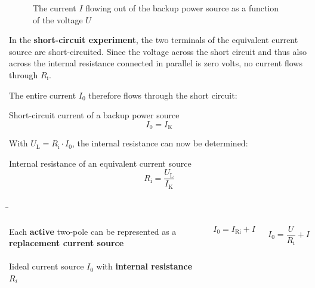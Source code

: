 \begin{frame}
{\begin{figure}[h!]
			\caption{The current $I$ flowing out of the backup power source as a function of the voltage $U$}
			\label{fig:kennliniestrom}
		\end{figure}
		
		
		
		In the \textbf{short-circuit experiment}, the two terminals of the equivalent current source are short-circuited. 
        Since the voltage across the short circuit and thus
        also across the internal resistance connected in parallel is zero volts, no current flows through 
        $R_\mathrm{i}$.

		The entire current $I_0$ therefore flows through the short circuit:
		
		
		
		\begin{Key point}{Short-circuit current of a backup power source}{}
			\begin{equation*}
				I_0 = I_\mathrm{K}
			\end{equation*}
		\end{Key point}
		
		
		
		
		With $U_\mathrm{L} = R_\mathrm{i} \cdot I_0$, the internal resistance can now be determined:
		
		\begin{Key point}{Internal resistance of an equivalent current source}{}
			\begin{equation*}
				R_\mathrm{i} = \frac{U_\mathrm{L}}{I_\mathrm{K}}
			\end{equation*}
		\end{Key point}	
		
	}
	\b{
	
		\begin{columns}
			
			
			Each \textbf{active} two-pole can be represented as a \textbf{replacement current source}\\
			
			\phantom{text}\\
			
			Iideal current source $I_0$ with 
			\textbf{internal resistance} $R_i$
			
			\begin{equation*}
				I_0 = I_\mathrm{Ri} + I
			\end{equation*}
			
			\begin{equation*}
				I_0 =\frac{U}{R_\mathrm{i}} + I
			\end{equation*}
			

\end{columns}}
\end{frame}
